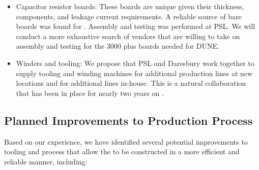 \begin{itemize}
\item Capacitor resistor boards: These boards are unique given their thickness, 
 components, and leakage current requirements. A reliable source of bare boards was found for . Assembly and testing was performed at PSL. We will conduct a more exhaustive search of vendors that are willing to take on assembly and testing for the \num{3000} plus boards needed for DUNE.

\item Winders and tooling: We propose that PSL and Daresbury work together to supply tooling and winding machines for additional production lines at new locations and for additional lines in-house. This is a natural collaboration that has been in place for nearly two years on .

\end{itemize}


\subsection{Planned Improvements to Production Process}

Based on our  experience, we have identified several potential improvements to tooling and process that allow the  to be constructed in a more efficient and reliable manner, including:


